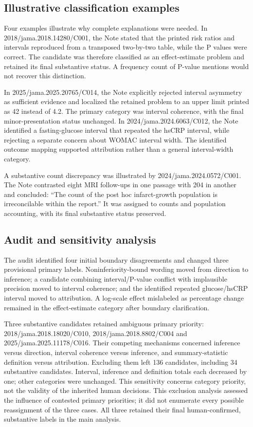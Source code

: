 \documentclass[11pt,a4paper]{article}
\begin{document}
\subsection{Illustrative classification examples}
Four examples illustrate why complete explanations were needed. In 2018/jama.2018.14280/C001, the Note stated that the printed risk ratios and intervals reproduced from a transposed two-by-two table, while the P values were correct. The candidate was therefore classified as an effect-estimate problem and retained its final substantive status. A frequency count of P-value mentions would not recover this distinction.\par
In 2025/jama.2025.20765/C014, the Note explicitly rejected interval asymmetry as sufficient evidence and localized the retained problem to an upper limit printed as 42 instead of 4.2. The primary category was interval coherence, with the final minor-presentation status unchanged. In 2024/jama.2024.6063/C012, the Note identified a fasting-glucose interval that repeated the hsCRP interval, while rejecting a separate concern about WOMAC interval width. The identified outcome mapping supported attribution rather than a general interval-width category.\par
A substantive count discrepancy was illustrated by 2024/jama.2024.0572/C001. The Note contrasted eight MRI follow-ups in one passage with 204 in another and concluded: “The count of the post hoc infarct-growth population is irreconcilable within the report.” It was assigned to counts and population accounting, with its final substantive status preserved.\par
\subsection{Audit and sensitivity analysis}
The audit identified four initial boundary disagreements and changed three provisional primary labels. Noninferiority-bound wording moved from direction to inference; a candidate combining interval/P-value conflict with implausible precision moved to interval coherence; and the identified repeated glucose/hsCRP interval moved to attribution. A log-scale effect mislabeled as percentage change remained in the effect-estimate category after boundary clarification.\par
Three substantive candidates retained ambiguous primary priority: 2018/jama.2018.18020/C010, 2018/jama.2018.8802/C004 and 2025/jama.2025.11178/C016. Their competing mechanisms concerned inference versus direction, interval coherence versus inference, and summary-statistic definition versus attribution. Excluding them left 136 candidates, including 34 substantive candidates. Interval, inference and definition totals each decreased by one; other categories were unchanged. This sensitivity concerns category priority, not the validity of the inherited human decisions. This exclusion analysis assessed the influence of contested primary priorities; it did not enumerate every possible reassignment of the three cases. All three retained their final human-confirmed, substantive labels in the main analysis.\par
\end{document}
